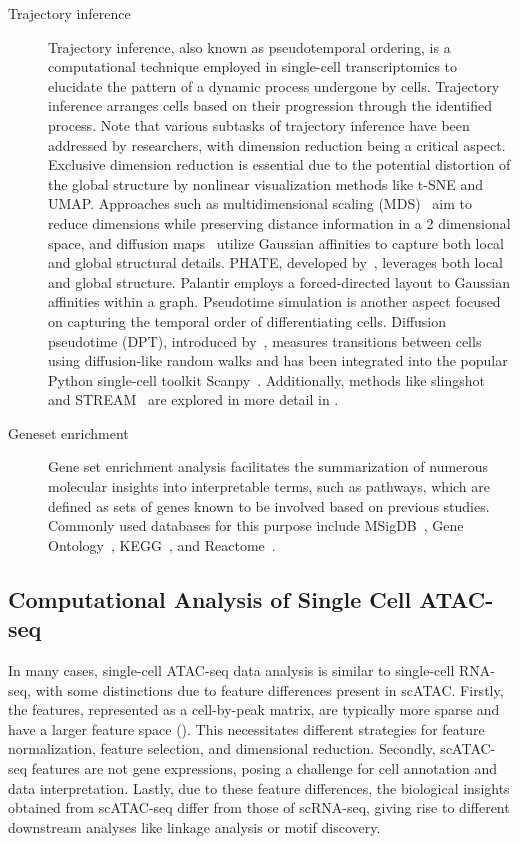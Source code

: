 \begin{description}
	\item[Trajectory inference]
	Trajectory inference, also known as pseudotemporal ordering, is a computational technique employed in single-cell transcriptomics to elucidate the pattern of a dynamic process undergone by cells. Trajectory inference arranges cells based on their progression through the identified process. Note that various subtasks of trajectory inference have been addressed by researchers, with dimension reduction being a critical aspect. Exclusive dimension reduction is essential due to the potential distortion of the global structure by nonlinear visualization methods like t-SNE and UMAP. Approaches such as multidimensional scaling (MDS)~\citep{torgerson1952multidimensional} aim to reduce dimensions while preserving distance information in a 2 dimensional space, and diffusion maps~\citep{coifman2006diffusion} utilize Gaussian affinities to capture both local and global structural details. PHATE, developed by~\cite{moon2017phate}, leverages both local and global structure. Palantir employs a forced-directed layout to Gaussian affinities within a graph. Pseudotime simulation is another aspect focused on capturing the temporal order of differentiating cells. Diffusion pseudotime (DPT), introduced by~\citep{haghverdi2016dpt}, measures transitions between cells using diffusion-like random walks and has been integrated into the popular Python single-cell toolkit Scanpy~\citep{wolf2018scanpy}. Additionally, methods like slingshot~\citep{street2018slingshot} and STREAM~\citep{chen2019stream} are explored in more detail in .

	\item[Geneset enrichment]
	Gene set enrichment analysis facilitates the summarization of numerous molecular insights into interpretable terms, such as pathways, which are defined as sets of genes known to be involved based on previous studies. Commonly used databases for this purpose include MSigDB~\citep{liberzon2011msigdb}, Gene Ontology~\citep{gene2004go}, KEGG~\citep{kanehisa2007kegg}, and Reactome~\citep{fabregat2018reactome}.
\end{description}

\subsection{Computational Analysis of Single Cell ATAC-seq}
\label{background:sec2:scATAC}
In many cases, single-cell ATAC-seq data analysis is similar to single-cell RNA-seq, with some distinctions due to feature differences present in scATAC. Firstly, the features, represented as a cell-by-peak matrix, are typically more sparse and have a larger feature space (). This necessitates different strategies for feature normalization, feature selection, and dimensional reduction. Secondly, scATAC-seq features are not gene expressions, posing a challenge for cell annotation and data interpretation. Lastly, due to these feature differences, the biological insights obtained from scATAC-seq differ from those of scRNA-seq, giving rise to different downstream analyses like linkage analysis or motif discovery.

